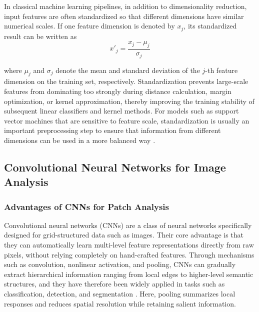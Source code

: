 \par In classical machine learning pipelines, in addition to dimensionality
reduction, input features are often standardized so that different dimensions
have similar numerical scales. If one feature dimension is denoted by $x_j$, its
standardized result can be written as
\begin{equation}
    x'_j=\frac{x_j-\mu_j}{\sigma_j}
    \label{eq:standardization-basic}
\end{equation}
\par where $\mu_j$ and $\sigma_j$ denote the mean and standard deviation of the
$j$-th feature dimension on the training set, respectively. Standardization
prevents large-scale features from dominating too strongly during distance
calculation, margin optimization, or kernel approximation, thereby improving the
training stability of subsequent linear classifiers and kernel methods. For
models such as support vector machines that are sensitive to feature scale,
standardization is usually an important preprocessing step to ensure that
information from different dimensions can be used in a more balanced way
\cite{hsu2003practical}.

\subsection{Convolutional Neural Networks for Image Analysis}
\subsubsection{Advantages of CNNs for Patch Analysis}
\par Convolutional neural networks (CNNs) are a class of neural networks
specifically designed for grid-structured data such as images. Their core
advantage is that they can automatically learn multi-level feature
representations directly from raw pixels, without relying completely on
hand-crafted features. Through mechanisms such as convolution, nonlinear
activation, and pooling, CNNs can gradually extract hierarchical information
ranging from local edges to higher-level semantic structures, and they have
therefore been widely applied in tasks such as classification, detection, and
segmentation \cite{lecun2002gradient,krizhevsky2012imagenet}. Here, pooling
summarizes local responses and reduces spatial resolution while retaining
salient information.

